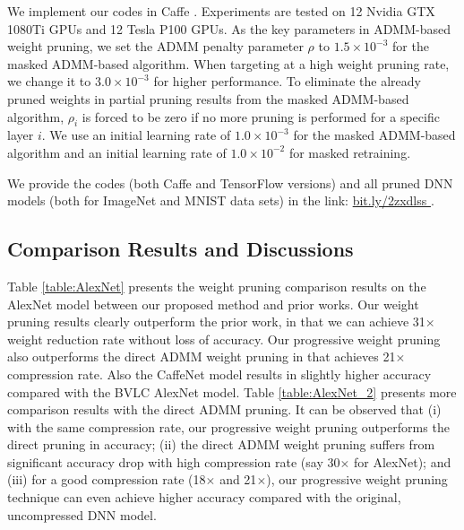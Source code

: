 \documentclass{article} %
\begin{document}
We implement our codes in Caffe \citep{jia2014caffe}.
Experiments are tested on 12 Nvidia GTX 1080Ti GPUs and 12 Tesla P100 GPUs.
As the key parameters in ADMM-based weight pruning, we set the ADMM penalty parameter $\rho$ to $1.5\times 10^{-3}$ for the masked ADMM-based algorithm.
When targeting at a high weight pruning rate, we change it to $3.0\times 10^{-3}$ for higher performance.
To eliminate the already pruned weights in partial pruning results from the masked ADMM-based algorithm, $\rho_i$ is forced to be zero if no more pruning is performed for a specific layer $i$.
We use an initial learning rate of $1.0\times 10^{-3}$ for the masked ADMM-based algorithm and an initial learning rate of $1.0\times 10^{-2}$ for masked retraining.

We provide the codes (both Caffe and TensorFlow versions) and all pruned DNN models (both for ImageNet and MNIST data sets) in the link: \url{bit.ly/2zxdlss	}.




\subsection{Comparison Results and Discussions}

Table \ref{table:AlexNet} presents the weight pruning comparison results on the AlexNet model between our proposed method and prior works. Our weight pruning results clearly outperform the prior work, in that we can achieve 31$\times$ weight reduction rate without loss of accuracy. 
Our progressive weight pruning also outperforms the direct ADMM weight pruning in \citet{zhang2018systematic} that achieves 21$\times$ compression rate. Also the CaffeNet model results in slightly higher accuracy compared with the BVLC AlexNet model. 
Table \ref{table:AlexNet_2} presents more comparison results with the direct ADMM pruning. It can be observed that (i) with the same compression rate, our progressive weight pruning outperforms the direct pruning in accuracy; (ii) the direct ADMM weight pruning suffers from significant accuracy drop with high compression rate (say 30$\times$ for AlexNet); and (iii) for a good compression rate (18$\times$ and 21$\times$), our progressive weight pruning technique can even achieve higher accuracy compared with the original, uncompressed DNN model.
\end{document}
